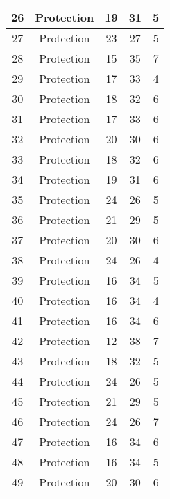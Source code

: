 \documentclass[results.tex]{subfiles}
\begin{document}
\begin{center}
\begin{tabular}{| c || c | c | c | c |}
    \hline
    26 & Protection & 19 & 31 & 5 \\ 
    \hline
    27 & Protection & 23 & 27 & 5 \\ 
    \hline
    28 & Protection & 15 & 35 & 7 \\ 
    \hline
    29 & Protection & 17 & 33 & 4 \\ 
    \hline
    30 & Protection & 18 & 32 & 6 \\ 
    \hline
    31 & Protection & 17 & 33 & 6 \\ 
    \hline
    32 & Protection & 20 & 30 & 6 \\ 
    \hline
    33 & Protection & 18 & 32 & 6 \\ 
    \hline
    34 & Protection & 19 & 31 & 6 \\ 
    \hline
    35 & Protection & 24 & 26 & 5 \\ 
    \hline
    36 & Protection & 21 & 29 & 5 \\ 
    \hline
    37 & Protection & 20 & 30 & 6 \\ 
    \hline
    38 & Protection & 24 & 26 & 4 \\ 
    \hline
    39 & Protection & 16 & 34 & 5 \\ 
    \hline
    40 & Protection & 16 & 34 & 4 \\ 
    \hline
    41 & Protection & 16 & 34 & 6 \\ 
    \hline
    42 & Protection & 12 & 38 & 7 \\ 
    \hline
    43 & Protection & 18 & 32 & 5 \\ 
    \hline
    44 & Protection & 24 & 26 & 5 \\ 
    \hline
    45 & Protection & 21 & 29 & 5 \\ 
    \hline
    46 & Protection & 24 & 26 & 7 \\ 
    \hline
    47 & Protection & 16 & 34 & 6 \\ 
    \hline
    48 & Protection & 16 & 34 & 5 \\ 
    \hline
    49 & Protection & 20 & 30 & 6 \\ 
    \hline   \end{tabular}
\end{center}
\end{document}
